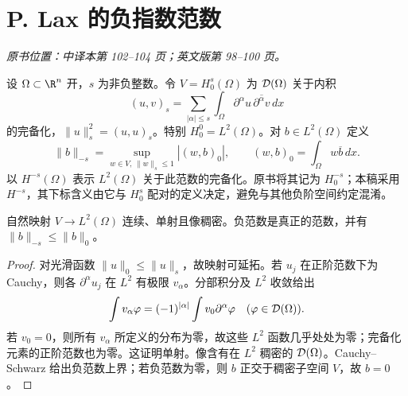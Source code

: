 \section{P. Lax 的负指数范数}\label{sec:yosida-03-10}
\noindent\textit{原书位置：中译本第 102--104 页；英文版第 98--100 页。}

\begin{definition}[正阶空间与负范数]
设 $\Omega\subset\R^n$ 开，$s$ 为非负整数。令 $V=H_0^s(\Omega)$ 为 $\mathcal{D}(\Omega)$ 关于内积
\[
 (u,v)_s=\sum_{|\alpha|\le s}\int_\Omega
 \partial^\alpha u\,\overline{\partial^\alpha v}\,dx
\]
的完备化，$\|u\|_s^2=(u,u)_s$。特别 $H_0^0=L^2(\Omega)$。对 $b\in L^2(\Omega)$ 定义
\[
 \|b\|_{-s}=\sup_{w\in V,\,\|w\|_s\le1}|(w,b)_0|,
 \qquad (w,b)_0=\int_\Omega w\overline b\,dx.
\]
以 $H^{-s}(\Omega)$ 表示 $L^2(\Omega)$ 关于此范数的完备化。原书将其记为 $H_0^{-s}$；本稿采用 $H^{-s}$，其下标含义由它与 $H_0^s$ 配对的定义决定，避免与其他负阶空间约定混淆。
\end{definition}

\begin{lemma}[正阶完备化确实嵌入 $L^2$]\label{lem:y3-sobolev-injection}
自然映射 $V\to L^2(\Omega)$ 连续、单射且像稠密。负范数是真正的范数，并有 $\|b\|_{-s}\le\|b\|_0$。
\end{lemma}
\begin{proof}
对光滑函数 $\|u\|_0\le\|u\|_s$，故映射可延拓。若 $u_j$ 在正阶范数下为 Cauchy，则各 $\partial^\alpha u_j$ 在 $L^2$ 有极限 $v_\alpha$。分部积分及 $L^2$ 收敛给出
\[
 \int v_\alpha\varphi=(-1)^{|\alpha|}\int v_0\partial^\alpha\varphi
 \quad(\varphi\in\mathcal{D}(\Omega)).
\]
若 $v_0=0$，则所有 $v_\alpha$ 所定义的分布为零，故这些 $L^2$ 函数几乎处处为零；完备化元素的正阶范数也为零。这证明单射。像含有在 $L^2$ 稠密的 $\mathcal{D}(\Omega)$。Cauchy--Schwarz 给出负范数上界；若负范数为零，则 $b$ 正交于稠密子空间 $V$，故 $b=0$。
\end{proof}


